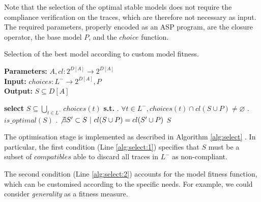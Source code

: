 Note that the selection of the optimal stable models does not require the compliance verification on the traces, which are therefore not necessary as input. The required parameters, properly encoded as an \ac{ASP} program, are the closure operator, the base model $P$, and the $choice$ function.



\begin{algorithm}
    \caption{Selection of the best model according to custom model fitness.}
    \label{alg:select}
    \textbf{Parameters:} $A, {cl}: 2^{D[A]} \rightarrow 2^{D[A]}$\\
    \textbf{Input:}  ${choices} : L^- \rightarrow 2^{D[A]}, P$\\
    \textbf{Output:} $S \subseteq D[A]$
	\begin{algorithmic}[1] 
	\State \textbf{select} $S \subseteq \bigcup_{t\in L^-} {choices}(t)$ \textbf{s.t.} \label{alg:subsetC}
	\Indent
		. $\forall t \in L^-, {choices}(t) \cap {cl}(S \cup P) \neq \varnothing$ 	\label{alg:select:1}
		. $is\_optimal(S)$									\label{alg:select:2}
		. $\not\exists S' \subset S ~|~ {cl}(S \cup P) = {cl}(S' \cup P)$		\label{alg:select:3}
	\EndIndent
	\State \Return $S$
    \EndProcedure
    \end{algorithmic}
\end{algorithm}



The optimisation stage is implemented as described in Algorithm \ref{alg:select}
. In particular, the first condition (Line \ref{alg:select:1}) specifies that $S$ must be a subset of ${compatibles}$ able to discard all traces in $L^-$ as non-compliant.

The second condition (Line \ref{alg:select:2}) accounts for the model fitness function, which can be customised according to the specific needs. For example, we could consider \emph{generality} as a fitness measure. 
%

